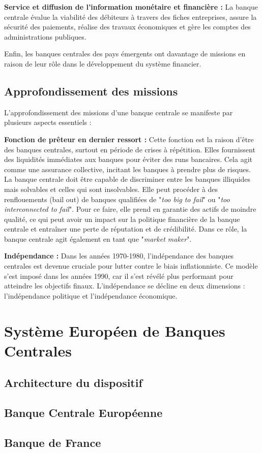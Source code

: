 \documentclass[a4paper, 12pt]{report}
\begin{document}
\textbf{Service et diffusion de l'information monétaire et financière :} La banque centrale évalue la viabilité des débiteurs à travers des fiches entreprises, assure la sécurité des paiements, réalise des travaux économiques et gère les comptes des administrations publiques.

Enfin, les banques centrales des pays émergents ont davantage de missions en raison de leur rôle dans le développement du système financier.

\subsection{Approfondissement des missions}

L'approfondissement des missions d'une banque centrale se manifeste par plusieurs aspects essentiels :

\textbf{Fonction de prêteur en dernier ressort :} Cette fonction est la raison d'être des banques centrales, surtout en période de crises à répétition. Elles fournissent des liquidités immédiates aux banques pour éviter des runs bancaires. Cela agit comme une assurance collective, incitant les banques à prendre plus de risques. La banque centrale doit être capable de discriminer entre les banques illiquides mais solvables et celles qui sont insolvables. Elle peut procéder à des renflouements (bail out) de banques qualifiées de "\textit{too big to fail}" ou "\textit{too interconnected to fail}". Pour ce faire, elle prend en garantie des actifs de moindre qualité, ce qui peut avoir un impact sur la politique financière de la banque centrale et entraîner une perte de réputation et de crédibilité. Dans ce rôle, la banque centrale agit également en tant que "\textit{market maker}".

\textbf{Indépendance :} Dans les années 1970-1980, l'indépendance des banques centrales est devenue cruciale pour lutter contre le biais inflationniste. Ce modèle s'est imposé dans les années 1990, car il s'est révélé plus performant pour atteindre les objectifs finaux. L'indépendance se décline en deux dimensions : l'indépendance politique et l'indépendance économique.



\section{Système Européen de Banques Centrales}
	
\subsection{Architecture du dispositif}
	
\subsection{Banque Centrale Européenne}
	
\subsection{Banque de France}
	
	
	
	
	
	
	
	
	
	
\end{document}
